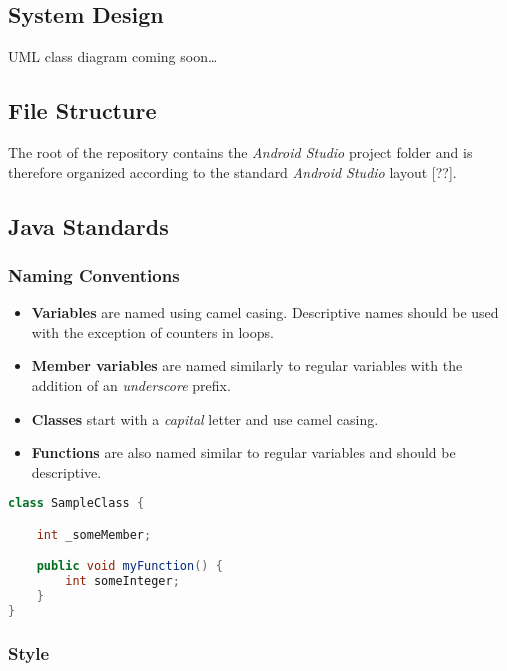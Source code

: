 \documentclass{article}
\begin{document}
    \subsection{System Design}
    \label{sec:ma-design}

    UML class diagram coming soon\ldots

    \subsection{File Structure}
    \label{sec:ma-struc}

    The root of the repository contains the \textit{Android Studio} project
    folder and is therefore organized according to the standard \textit{Android
    Studio} layout [??].

    \subsection{Java Standards}
    \label{sec:java}

    \subsubsection{Naming Conventions}
    \label{sec:java-nc}

    \begin{itemize}
        \item \textbf{Variables} are named using camel casing. Descriptive names
                should be used with the exception of counters in loops.
        \item \textbf{Member variables} are named similarly to regular variables
                with the addition of an \textit{underscore} prefix.
        \item \textbf{Classes} start with a \textit{capital} letter and use
                camel casing.
        \item \textbf{Functions} are also named similar to regular variables and
                should be descriptive.
    \end{itemize}

    \begin{lstlisting}[language=java]
class SampleClass {

    int _someMember;

    public void myFunction() {
        int someInteger;
    }
}
    \end{lstlisting}

    \subsubsection{Style}
    \label{sec:java-st}
\end{document}
